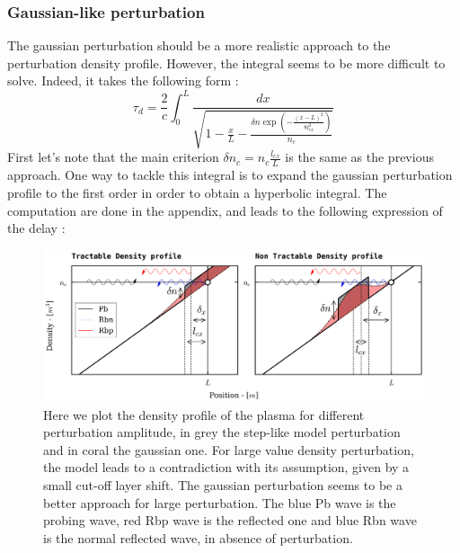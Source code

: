 \documentclass[11pt,a4paper]{report}
\begin{document}
\begin{multicols}{2}
    \subsubsection{Gaussian-like perturbation}
    The gaussian perturbation should be a more realistic approach to the perturbation density profile. However, the integral seems to be more difficult to solve. Indeed, it takes the following form :
    $$\tau_d = \frac{2}{c} \int_0^L \frac{dx}{\sqrt{1 - \frac{x}{L} - \frac{\delta n\exp(-\frac{(x - L)^2}{8l_{cx}^2})}{n_c}}}$$
    First let's note that the main criterion $\delta n_c = n_c \frac{l_{cx}}{L}$ is the same as the previous approach.  One way to tackle this integral is to expand the gaussian perturbation profile to the first order in order to obtain a hyperbolic integral. The computation are done in the appendix, and leads to the following expression of the delay :

\end{multicols}

\begin{figure}[H]
    \centering
    \includegraphics[width = 1\linewidth]{./figures/density_profile.png}
    \caption{Here we plot the density profile of the plasma for different perturbation amplitude, in grey the step-like model perturbation and in coral the gaussian one. For large value density perturbation, the model leads to a contradiction with its assumption, given by a small cut-off layer shift.
        The gaussian perturbation seems to be a better approach for large perturbation. The blue Pb wave is the probing wave, red Rbp wave is the reflected one and blue Rbn wave is the normal reflected wave, in absence of perturbation.}
    \label{}
\end{figure}
\end{document}
